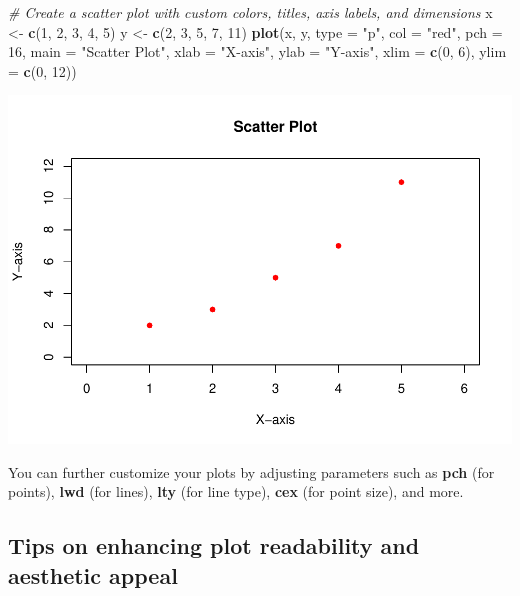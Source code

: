 \documentclass[
]{book}
\newenvironment{Shaded}{\begin{snugshade}}{\end{snugshade}}
\newcommand{\AttributeTok}[1]{\textcolor[rgb]{0.13,0.29,0.53}{#1}}
\newcommand{\CommentTok}[1]{\textcolor[rgb]{0.56,0.35,0.01}{\textit{#1}}}
\newcommand{\DecValTok}[1]{\textcolor[rgb]{0.00,0.00,0.81}{#1}}
\newcommand{\FunctionTok}[1]{\textcolor[rgb]{0.13,0.29,0.53}{\textbf{#1}}}
\newcommand{\NormalTok}[1]{#1}
\newcommand{\OtherTok}[1]{\textcolor[rgb]{0.56,0.35,0.01}{#1}}
\newcommand{\StringTok}[1]{\textcolor[rgb]{0.31,0.60,0.02}{#1}}
\begin{document}
\begin{Shaded}
\begin{Highlighting}[]
\CommentTok{\# Create a scatter plot with custom colors, titles, axis labels, and dimensions}
\NormalTok{x }\OtherTok{\textless{}{-}} \FunctionTok{c}\NormalTok{(}\DecValTok{1}\NormalTok{, }\DecValTok{2}\NormalTok{, }\DecValTok{3}\NormalTok{, }\DecValTok{4}\NormalTok{, }\DecValTok{5}\NormalTok{)}
\NormalTok{y }\OtherTok{\textless{}{-}} \FunctionTok{c}\NormalTok{(}\DecValTok{2}\NormalTok{, }\DecValTok{3}\NormalTok{, }\DecValTok{5}\NormalTok{, }\DecValTok{7}\NormalTok{, }\DecValTok{11}\NormalTok{)}
\FunctionTok{plot}\NormalTok{(x, y, }\AttributeTok{type =} \StringTok{"p"}\NormalTok{, }\AttributeTok{col =} \StringTok{"red"}\NormalTok{, }\AttributeTok{pch =} \DecValTok{16}\NormalTok{, }\AttributeTok{main =} \StringTok{"Scatter Plot"}\NormalTok{, }\AttributeTok{xlab =} \StringTok{"X{-}axis"}\NormalTok{, }\AttributeTok{ylab =} \StringTok{"Y{-}axis"}\NormalTok{, }\AttributeTok{xlim =} \FunctionTok{c}\NormalTok{(}\DecValTok{0}\NormalTok{, }\DecValTok{6}\NormalTok{), }\AttributeTok{ylim =} \FunctionTok{c}\NormalTok{(}\DecValTok{0}\NormalTok{, }\DecValTok{12}\NormalTok{))}
\end{Highlighting}
\end{Shaded}

\includegraphics{_main_files/figure-latex/unnamed-chunk-35-1.pdf}

You can further customize your plots by adjusting parameters such as \textbf{pch} (for points), \textbf{lwd} (for lines), \textbf{lty} (for line type), \textbf{cex} (for point size), and more.

\subsection{Tips on enhancing plot readability and aesthetic appeal}\label{tips-on-enhancing-plot-readability-and-aesthetic-appeal}
\end{document}
